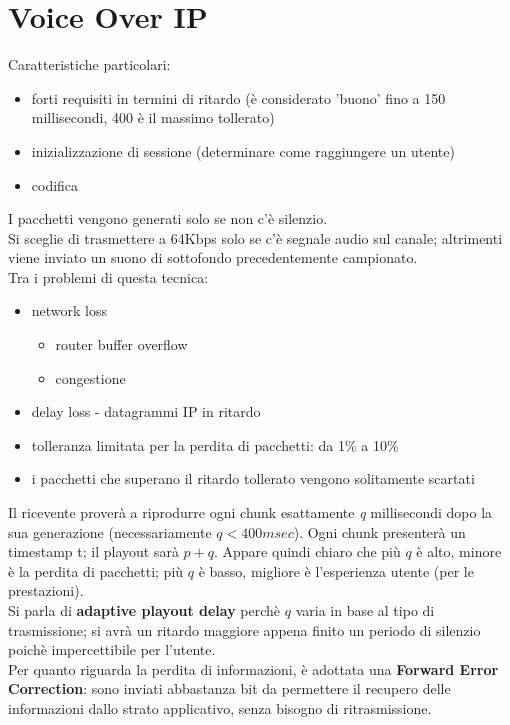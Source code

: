 \section{Voice Over IP}
Caratteristiche particolari:
\begin{itemize}
    \item forti requisiti in termini di ritardo (è considerato 'buono' fino a 150 millisecondi, 400 è il massimo tollerato)
    \item inizializzazione di sessione (determinare come raggiungere un utente)
    \item codifica
\end{itemize}
I pacchetti vengono generati solo se non c'è silenzio.\\
Si sceglie di trasmettere a 64Kbps solo se c'è segnale audio sul canale; altrimenti viene inviato un suono di sottofondo precedentemente campionato.\\
Tra i problemi di questa tecnica:
\begin{itemize}
    \item network loss
    \begin{itemize}
        \item router buffer overflow
        \item congestione
    \end{itemize}
    \item delay loss - datagrammi IP in ritardo
    \item tolleranza limitata per la perdita di pacchetti: da 1\% a 10\%
    \item i pacchetti che superano il ritardo tollerato vengono solitamente scartati
\end{itemize}
Il ricevente proverà a riprodurre ogni chunk esattamente \textit{q} millisecondi dopo la sua generazione (necessariamente $ q < 400msec $). Ogni chunk presenterà un timestamp t; il playout sarà $ p+q $. Appare quindi chiaro che più $ q $ è alto, minore è la perdita di pacchetti; più $ q $ è basso, migliore è l'esperienza utente (per le prestazioni).\\
Si parla di \textbf{adaptive playout delay} perchè $ q $ varia in base al tipo di trasmissione; si avrà un ritardo maggiore appena finito un periodo di silenzio poichè impercettibile per l'utente.\\
Per quanto riguarda la perdita di informazioni, è adottata una \textbf{Forward Error Correction}: sono inviati abbastanza bit da permettere il recupero delle informazioni dallo strato applicativo, senza bisogno di ritrasmissione.\\
